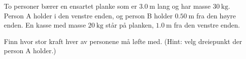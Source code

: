 %
To personer bærer en ensartet planke som er $\SI{3.0}{\metre}$ lang og har masse $\SI{30}{\kilo\gram}$. Person A holder i den venstre enden, og person B holder $\SI{0.50}{\metre}$ fra den høyre enden. En kasse med masse $\SI{20}{\kilo\gram}$ står på planken, $\SI{1.0}{\metre}$ fra den venstre enden.

Finn hvor stor kraft hver av personene må løfte med. (Hint: velg dreiepunkt der person A holder.)
